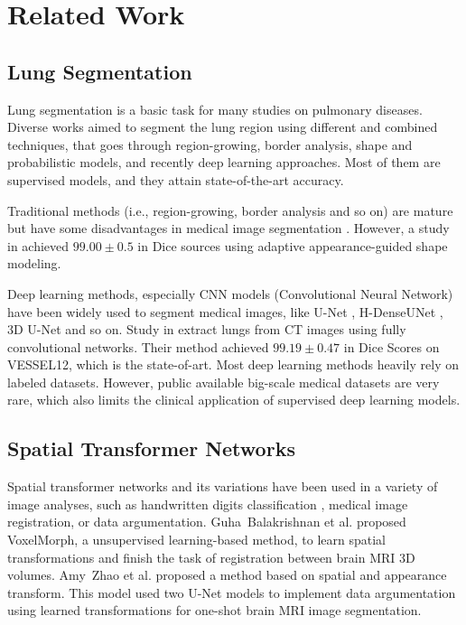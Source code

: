 \documentclass{article}
\begin{document}
\section{Related Work}
\label{sec:related}
\subsection{Lung Segmentation}
Lung segmentation is a basic task for many studies on pulmonary diseases. Diverse works aimed to segment the lung region using different and combined techniques, that goes through region-growing, border analysis, shape and probabilistic models, and recently deep learning approaches. Most of them are supervised models, and they attain state-of-the-art accuracy. 

Traditional methods (i.e., region-growing, border analysis and so on) are mature but have some disadvantages in medical image segmentation \cite{adams1994seeded, kass1988snakes, canny1987computational}.
However, a study in \cite{soliman2016accurate} achieved $99.00 \pm 0.5$ in Dice sources using adaptive appearance-guided shape modeling.

Deep learning methods, especially CNN models (Convolutional Neural Network) have been widely used to segment medical images, like U-Net \cite{ronneberger2015u}, H-DenseUNet \cite{li2018h}, 3D U-Net \cite{cciccek20163d} and so on. 
Study in \cite{alves2018extracting} extract lungs from CT images using fully convolutional networks. Their method achieved $99.19 \pm 0.47$ in Dice Scores on VESSEL12, which is the state-of-art.
Most deep learning methods heavily rely on labeled datasets. However, public available big-scale medical datasets are very rare, which also limits the clinical application of supervised deep learning models.

\subsection{Spatial Transformer Networks}
Spatial transformer networks \cite{jaderberg2015spatial} and its variations have been used in a variety of image analyses, such as handwritten digits classification \cite{hauberg2016dreaming, learned2005data}, medical image registration, or data argumentation.
Guha~Balakrishnan et al. \cite{balakrishnan2019tmi} proposed VoxelMorph, a unsupervised learning-based method, to learn spatial transformations and finish the task of registration between brain MRI 3D volumes. Amy~Zhao et al. \cite{zhao2019data} proposed a method based on spatial and appearance transform. This model used two U-Net models to implement data argumentation using learned transformations for one-shot brain MRI image segmentation. 
\end{document}
